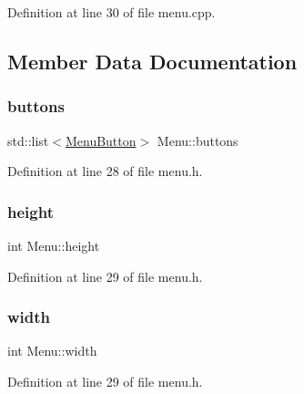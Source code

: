 Definition at line 30 of file menu.\+cpp.



\subsection{Member Data Documentation}
\mbox{\label{class_menu_a631c3c73e1f05159ddc2e967b7b4bca7}} 
\subsubsection{\texorpdfstring{buttons}{buttons}}
{\footnotesize\ttfamily std\+::list$<$\mbox{\hyperlink{struct_menu_button}{Menu\+Button}}$>$ Menu\+::buttons\hspace{0.3cm}{\ttfamily [private]}}



Definition at line 28 of file menu.\+h.

\mbox{\label{class_menu_abfd154ce7b19dca62d1ce8483c6f7bba}} 
\subsubsection{\texorpdfstring{height}{height}}
{\footnotesize\ttfamily int Menu\+::height\hspace{0.3cm}{\ttfamily [private]}}



Definition at line 29 of file menu.\+h.

\mbox{\label{class_menu_a30ec519ffccb75388150c64175c4959b}} 
\subsubsection{\texorpdfstring{width}{width}}
{\footnotesize\ttfamily int Menu\+::width\hspace{0.3cm}{\ttfamily [private]}}



Definition at line 29 of file menu.\+h.

\mbox{\label{class_menu_a26c11055ab1fe19a4862689d4ff85dc7}} 

